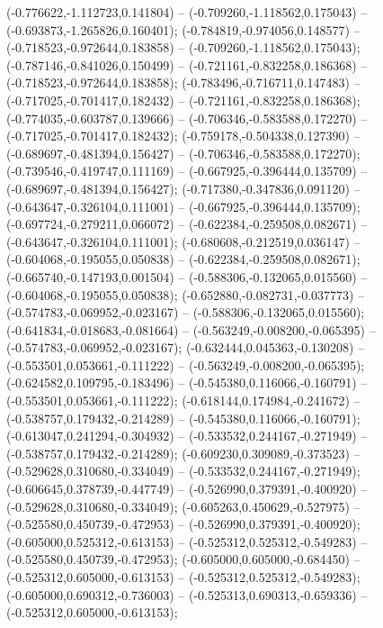  (-0.776622,-1.112723,0.141804) -- (-0.709260,-1.118562,0.175043) -- (-0.693873,-1.265826,0.160401);
 (-0.784819,-0.974056,0.148577) -- (-0.718523,-0.972644,0.183858) -- (-0.709260,-1.118562,0.175043);
 (-0.787146,-0.841026,0.150499) -- (-0.721161,-0.832258,0.186368) -- (-0.718523,-0.972644,0.183858);
 (-0.783496,-0.716711,0.147483) -- (-0.717025,-0.701417,0.182432) -- (-0.721161,-0.832258,0.186368);
 (-0.774035,-0.603787,0.139666) -- (-0.706346,-0.583588,0.172270) -- (-0.717025,-0.701417,0.182432);
 (-0.759178,-0.504338,0.127390) -- (-0.689697,-0.481394,0.156427) -- (-0.706346,-0.583588,0.172270);
 (-0.739546,-0.419747,0.111169) -- (-0.667925,-0.396444,0.135709) -- (-0.689697,-0.481394,0.156427);
 (-0.717380,-0.347836,0.091120) -- (-0.643647,-0.326104,0.111001) -- (-0.667925,-0.396444,0.135709);
 (-0.697724,-0.279211,0.066072) -- (-0.622384,-0.259508,0.082671) -- (-0.643647,-0.326104,0.111001);
 (-0.680608,-0.212519,0.036147) -- (-0.604068,-0.195055,0.050838) -- (-0.622384,-0.259508,0.082671);
 (-0.665740,-0.147193,0.001504) -- (-0.588306,-0.132065,0.015560) -- (-0.604068,-0.195055,0.050838);
 (-0.652880,-0.082731,-0.037773) -- (-0.574783,-0.069952,-0.023167) -- (-0.588306,-0.132065,0.015560);
 (-0.641834,-0.018683,-0.081664) -- (-0.563249,-0.008200,-0.065395) -- (-0.574783,-0.069952,-0.023167);
 (-0.632444,0.045363,-0.130208) -- (-0.553501,0.053661,-0.111222) -- (-0.563249,-0.008200,-0.065395);
 (-0.624582,0.109795,-0.183496) -- (-0.545380,0.116066,-0.160791) -- (-0.553501,0.053661,-0.111222);
 (-0.618144,0.174984,-0.241672) -- (-0.538757,0.179432,-0.214289) -- (-0.545380,0.116066,-0.160791);
 (-0.613047,0.241294,-0.304932) -- (-0.533532,0.244167,-0.271949) -- (-0.538757,0.179432,-0.214289);
 (-0.609230,0.309089,-0.373523) -- (-0.529628,0.310680,-0.334049) -- (-0.533532,0.244167,-0.271949);
 (-0.606645,0.378739,-0.447749) -- (-0.526990,0.379391,-0.400920) -- (-0.529628,0.310680,-0.334049);
 (-0.605263,0.450629,-0.527975) -- (-0.525580,0.450739,-0.472953) -- (-0.526990,0.379391,-0.400920);
 (-0.605000,0.525312,-0.613153) -- (-0.525312,0.525312,-0.549283) -- (-0.525580,0.450739,-0.472953);
 (-0.605000,0.605000,-0.684450) -- (-0.525312,0.605000,-0.613153) -- (-0.525312,0.525312,-0.549283);
 (-0.605000,0.690312,-0.736003) -- (-0.525313,0.690313,-0.659336) -- (-0.525312,0.605000,-0.613153);
